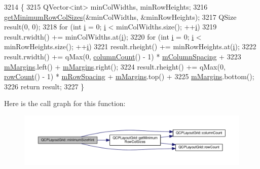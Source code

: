 \begin{DoxyCode}
3214                                            \{
3215   QVector<int> minColWidths, minRowHeights;
3216   \hyperlink{class_q_c_p_layout_grid_ac645fb9b1c4257b08a9f09dee10b9b3f}{getMinimumRowColSizes}(&minColWidths, &minRowHeights);
3217   QSize result(0, 0);
3218   \textcolor{keywordflow}{for} (\textcolor{keywordtype}{int} \hyperlink{_comparision_pictures_2_createtest_image_8m_a6f6ccfcf58b31cb6412107d9d5281426}{i} = 0; \hyperlink{_comparision_pictures_2_createtest_image_8m_a6f6ccfcf58b31cb6412107d9d5281426}{i} < minColWidths.size(); ++\hyperlink{_comparision_pictures_2_createtest_image_8m_a6f6ccfcf58b31cb6412107d9d5281426}{i})
3219     result.rwidth() += minColWidths.at(\hyperlink{_comparision_pictures_2_createtest_image_8m_a6f6ccfcf58b31cb6412107d9d5281426}{i});
3220   \textcolor{keywordflow}{for} (\textcolor{keywordtype}{int} \hyperlink{_comparision_pictures_2_createtest_image_8m_a6f6ccfcf58b31cb6412107d9d5281426}{i} = 0; \hyperlink{_comparision_pictures_2_createtest_image_8m_a6f6ccfcf58b31cb6412107d9d5281426}{i} < minRowHeights.size(); ++\hyperlink{_comparision_pictures_2_createtest_image_8m_a6f6ccfcf58b31cb6412107d9d5281426}{i})
3221     result.rheight() += minRowHeights.at(\hyperlink{_comparision_pictures_2_createtest_image_8m_a6f6ccfcf58b31cb6412107d9d5281426}{i});
3222   result.rwidth() += qMax(0, \hyperlink{class_q_c_p_layout_grid_ac39074eafd148b82d0762090f258189e}{columnCount}() - 1) * \hyperlink{class_q_c_p_layout_grid_ae9ac48f0791be07ead0a96dbd5622770}{mColumnSpacing} +
3223                      \hyperlink{class_q_c_p_layout_element_ac2a32b99ee527ca5dfff9da03628fe94}{mMargins}.left() + \hyperlink{class_q_c_p_layout_element_ac2a32b99ee527ca5dfff9da03628fe94}{mMargins}.right();
3224   result.rheight() += qMax(0, \hyperlink{class_q_c_p_layout_grid_af8e6c7a05864ebe610c87756c7b9079c}{rowCount}() - 1) * \hyperlink{class_q_c_p_layout_grid_a8b67f183f4645739cc4c794d75843b40}{mRowSpacing} + 
      \hyperlink{class_q_c_p_layout_element_ac2a32b99ee527ca5dfff9da03628fe94}{mMargins}.top() +
3225                       \hyperlink{class_q_c_p_layout_element_ac2a32b99ee527ca5dfff9da03628fe94}{mMargins}.bottom();
3226   \textcolor{keywordflow}{return} result;
3227 \}
\end{DoxyCode}


Here is the call graph for this function\+:\nopagebreak
\begin{figure}[H]
\begin{center}
\leavevmode
\includegraphics[width=350pt]{class_q_c_p_layout_grid_a67aae235fb4dd9a479aafe07462ef9ee_cgraph}
\end{center}
\end{figure}





